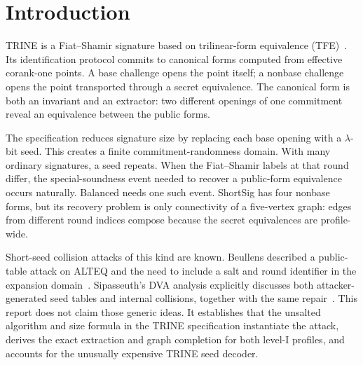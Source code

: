 \documentclass[11pt,a4paper]{article}
\begin{document}
\begin{abstract}
The untouched submitted C source serializes a fresh $2\lambda$-bit salt and
absorbs it in every round expansion.  That source-only field is absent from the
specification algorithms and size formula, makes level-I signatures 32 bytes
longer, and blocks this cross-signature accumulation.  We therefore claim an
attack only on the direct unsalted, message-independent construction described
in the specification, not on the untouched salted source.  The generic
short-seed collision attack and the salt-plus-round repair are due to Beullens
and Sipasseuth.  Our contribution is
limited to the TRINE instantiation: the specification/source discrepancy,
canonical-certificate extraction, one-edge Balanced completion, connected-graph
ShortSig completion, exact level-I resource analysis, and end-to-end validation.
\end{abstract}

\section{Introduction}

TRINE is a Fiat--Shamir signature based on trilinear-form equivalence
(TFE)~\cite{trine-spec}.  Its identification protocol commits to canonical
forms computed from effective corank-one points.  A base challenge opens the
point itself; a nonbase challenge opens the point transported through a secret
equivalence.  The canonical form is both an invariant and an extractor: two
different openings of one commitment reveal an equivalence between the public
forms.

The specification reduces signature size by replacing each base opening with a
$\lambda$-bit seed.  This creates a finite commitment-randomness domain.  With
many ordinary signatures, a seed repeats.  When the Fiat--Shamir labels at that
round differ, the special-soundness event needed to recover a public-form
equivalence occurs naturally.  Balanced needs one such event.  ShortSig has
four nonbase forms, but its recovery problem is only connectivity of a
five-vertex graph: edges from different round indices compose because the
secret equivalences are profile-wide.

Short-seed collision attacks of this kind are known.  Beullens described a
public-table attack on ALTEQ and the need to include a salt and round identifier
in the expansion domain~\cite{beullens2024}.  Sipasseuth's DVA analysis
explicitly discusses both attacker-generated seed tables and internal
collisions, together with the same repair~\cite[Sec.~3.2]{sipasseuth2024}.
This report does not claim those generic ideas.  It establishes that the
unsalted algorithm and size formula in the TRINE specification instantiate the
attack, derives the exact extraction and graph completion for both level-I
profiles, and accounts for the unusually expensive TRINE seed decoder.
\end{document}
